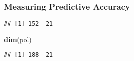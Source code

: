 \documentclass[
]{article}
\newenvironment{Shaded}{\begin{snugshade}}{\end{snugshade}}
\newcommand{\AttributeTok}[1]{\textcolor[rgb]{0.13,0.29,0.53}{#1}}
\newcommand{\FloatTok}[1]{\textcolor[rgb]{0.00,0.00,0.81}{#1}}
\newcommand{\FunctionTok}[1]{\textcolor[rgb]{0.13,0.29,0.53}{\textbf{#1}}}
\newcommand{\NormalTok}[1]{#1}
\newcommand{\OtherTok}[1]{\textcolor[rgb]{0.56,0.35,0.01}{#1}}
\newcommand{\SpecialCharTok}[1]{\textcolor[rgb]{0.81,0.36,0.00}{\textbf{#1}}}
\begin{document}
\subsubsection{Measuring Predictive
Accuracy}\label{measuring-predictive-accuracy}

\begin{Shaded}
\end{Shaded}

\begin{verbatim}
## [1] 152  21
\end{verbatim}

\begin{Shaded}
\begin{Highlighting}[]
\FunctionTok{dim}\NormalTok{(pol) }
\end{Highlighting}
\end{Shaded}

\begin{verbatim}
## [1] 188  21
\end{verbatim}
\end{document}
